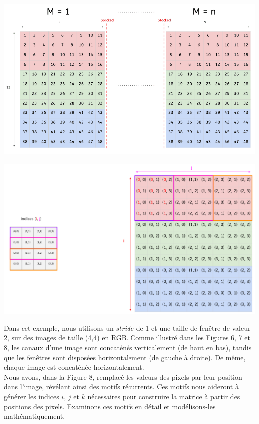 \begin{multicols}{2}
\includegraphics[width=\columnwidth]{images/im2col-2.png}
\hfill\break

\includegraphics[width=\columnwidth]{images/im2col-3.png}
\hfill\break

Dans cet exemple, nous utilisons un $stride$ de 1 et une taille de fenêtre de valeur 2, sur des images de taille (4,4) en RGB. 
Comme illustré dans les Figures 6, 7 et 8, les canaux d’une image sont 
concaténés verticalement (de haut en bas), tandis que les fenêtres sont 
disposées horizontalement (de gauche à droite). De même, chaque image est 
concaténée horizontalement. \\

Nous avons, dans la Figure 8, remplacé les valeurs des pixels par leur position dans 
l’image, révélant ainsi des motifs récurrents. Ces motifs nous aideront à 
générer les indices $i$, $j$ et $k$ nécessaires pour construire la matrice à 
partir des positions des pixels. Examinons ces motifs en détail et 
modélisons-les mathématiquement. \\


\end{multicols}
